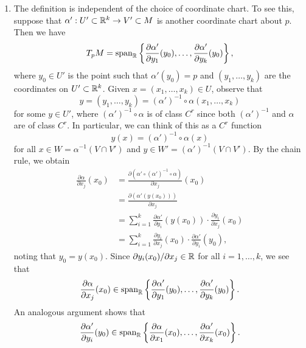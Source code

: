 \begin{enumerate}[(1)]
    \item The definition is independent of the choice of coordinate chart. 
    To see this, suppose that $\alpha' : U' \subset \mathbb{R}^k 
    \to V' \subset M$ is another coordinate chart about $p$. Then we have 
    \[ T_pM = \operatorname{span}_{\mathbb{R}} \left\{ \frac{\partial \alpha'}{\partial y_1}(y_0), 
    \dots, \frac{\partial \alpha'}{\partial y_k}(y_0) \right\}, \] 
    where $y_0 \in U'$ is the point such that $\alpha'(y_0) = p$ and 
    $(y_1, \dots, y_k)$ are the coordinates 
    on $U' \subset \mathbb{R}^k$. Given $x = (x_1, \dots, x_k) \in U$, observe that
    \[ y = (y_1, \dots, y_k) = (\alpha')^{-1} \circ \alpha(x_1, \dots, x_k) \]
    for some $y \in U'$, where $(\alpha')^{-1} \circ \alpha$ is of class $C^r$ 
    since both $(\alpha')^{-1}$ and $\alpha$ are of class $C^r$. In particular, 
    we can think of this as a $C^r$ function 
    \[ y(x) = (\alpha')^{-1} \circ \alpha(x) \] 
    for all $x \in W = \alpha^{-1}(V \cap V')$ and $y \in W' = (\alpha')^{-1}
    (V \cap V')$. By the chain rule, we obtain
    \begin{align*}
        \frac{\partial\alpha}{\partial x_j}(x_0) 
        &= \frac{\partial(\alpha' \circ (\alpha')^{-1} \circ \alpha)}{\partial x_j}(x_0) \\ 
        &= \frac{\partial(\alpha'(y(x_0)))}{\partial x_j} \\ 
        &= \sum_{i=1}^k \frac{\partial\alpha'}{\partial y_i} (y(x_0)) \cdot 
        \frac{\partial y_i}{\partial x_j}(x_0) \\ 
        &= \sum_{i=1}^k \frac{\partial y_i}{\partial x_j}(x_0) \cdot 
        \frac{\partial\alpha'}{\partial y_i}(y_0), 
    \end{align*}
    noting that $y_0 = y(x_0)$. Since $\partial y_i(x_0)/\partial x_j \in \mathbb{R}$ 
    for all $i = 1, \dots, k$, we see that 
    \[ \frac{\partial\alpha}{\partial x_j}(x_0) \in \operatorname{span}_{\mathbb{R}}
    \left\{ \frac{\partial \alpha'}{\partial y_1}(y_0), 
    \dots, \frac{\partial \alpha'}{\partial y_k}(y_0) \right\}. \] 
    An analogous argument shows that 
    \[ \frac{\partial\alpha'}{\partial y_i}(y_0) \in \operatorname{span}_{\mathbb{R}}
    \left\{ \frac{\partial \alpha}{\partial x_1}(x_0), 
    \dots, \frac{\partial \alpha'}{\partial x_k}(x_0) \right\}. \] 


\end{enumerate}
